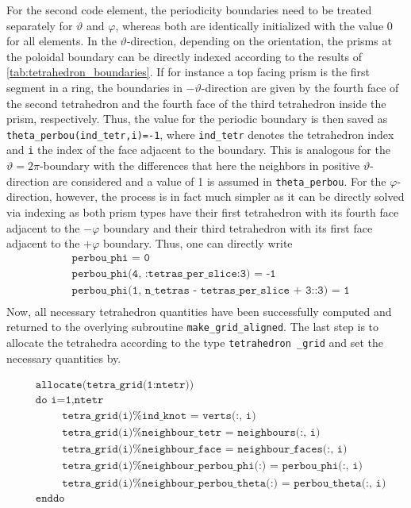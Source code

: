 \documentclass[./main.tex]{subfiles}
\begin{document}
For the second code element, the periodicity boundaries need to be treated separately for $\vartheta$ and $\varphi$, whereas both are identically initialized with the value 0 for all elements. In the $\vartheta$-direction, depending on the orientation, the prisms at the poloidal boundary can be directly indexed according to the results of \ref{tab:tetrahedron_boundaries}. If for instance a top facing prism is the first segment in a ring, the boundaries in $-\vartheta$-direction are given by the fourth face of the second tetrahedron and the fourth face of the third tetrahedron inside the prism, respectively. Thus, the value for the periodic boundary is then saved as \texttt{theta\_perbou(ind\_tetr,i)=-1}, where \texttt{ind\_tetr} denotes the tetrahedron index and \texttt{i} the index of the face adjacent to the boundary. This is analogous for the $\vartheta=2\pi$-boundary with the differences that here the neighbors in positive $\vartheta$-direction are considered and a value of 1 is assumed in \texttt{theta\_perbou}. For the $\varphi$-direction, however, the process is in fact much simpler as it can be directly solved via indexing as both prism types have their first tetrahedron with its fourth face adjacent to the $-\varphi$ boundary and their third tetrahedron with its first face adjacent to the $+\varphi$ boundary. Thus, one can directly write
\begin{align*}
&\texttt{perbou\_phi = 0}\nonumber\\
&\texttt{perbou\_phi(4, :tetras\_per\_slice:3) = -1}\nonumber\\
&\texttt{perbou\_phi(1, n\_tetras - tetras\_per\_slice + 3::3) = 1}\nonumber\\
\end{align*}
Now, all necessary tetrahedron quantities have been successfully computed and returned to the overlying subroutine \texttt{make\_grid\_aligned}. The last step is to allocate the tetrahedra according to the type \texttt{tetrahedron \_grid} and set the necessary quantities by.

\begin{align*}
&\texttt{allocate(tetra\_grid(1:ntetr))}\nonumber\\
&\texttt{do i=1,ntetr}\nonumber\\
&\hspace{1cm}\texttt{tetra\_grid(i)\%ind\_knot = verts(:, i)}\nonumber\\
&\hspace{1cm}\texttt{tetra\_grid(i)\%neighbour\_tetr = neighbours(:, i)}\nonumber\\
&\hspace{1cm}\texttt{tetra\_grid(i)\%neighbour\_face = neighbour\_faces(:, i)}\nonumber\\
&\hspace{1cm}\texttt{tetra\_grid(i)\%neighbour\_perbou\_phi(:) = perbou\_phi(:, i)}\nonumber\\
&\hspace{1cm}\texttt{tetra\_grid(i)\%neighbour\_perbou\_theta(:) = perbou\_theta(:, i)}\nonumber\\
&\texttt{enddo}\nonumber\\
\end{align*}
\end{document}

